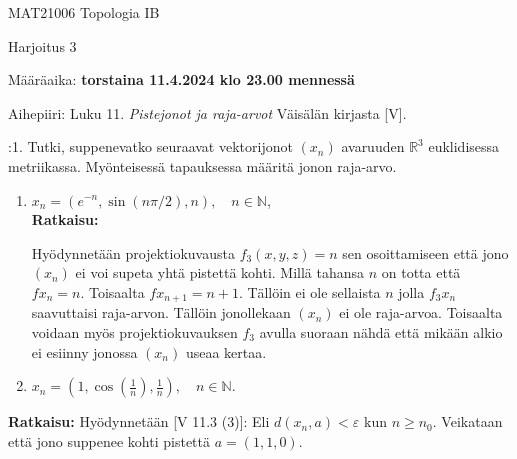 \documentclass[12pt,a4paper,leqno]{amsart}
\begin{document}
\noindent MAT21006 Topologia IB

\noindent Harjoitus 3 

\noindent  Määräaika:  \textbf{torstaina 11.4.2024 klo 23.00 mennessä} 

\bigskip
\begin{comment}

\noindent Ratkaisut palautetaan sähköisesti määräaikaan mennessä kurssin Moodle sivun viikottaiseen palautusalueeseen yhtenä (1) pdf-lähetyksenä. 

\smallskip

Viikolla 8.4-12.4.2024 on normaalit ohjausvuorot: tiistaina 9.4 klo 14.15-16  salissa  C322 ja  torstaina 11.4 klo 14-16 Ratkomossa  (kurssin Topologia IB ohjaaja).

\smallskip

Muina aikoina voi  kysyä  neuvoja tehtäviin Ratkomossa tai kurssin Moodle sivun Keskustelualueissa. Kurssin Topologia IA
Telegram-ryhmä jatkaa. 

\end{comment}
\medskip

Aihepiiri:  Luku 11. \textit{Pistejonot ja raja-arvot} Väisälän kirjasta [V]. 

\bigskip

:1.   Tutki, suppenevatko seuraavat vektorijonot $(x_n)$ avaruuden 
$\mathbb R^3$ euklidisessa metriikassa. Myönteisessä tapauksessa
määritä jonon raja-arvo.

\begin{enumerate}
\item  $x_n = (e^{-n},\sin(n\pi/2),n),  \quad n \in \mathbb N$,
\\
\textbf{Ratkaisu:}

Hyödynnetään projektiokuvausta $f_3(x, y, z) = n$ sen osoittamiseen että jono $(x_n)$ ei voi supeta yhtä pistettä kohti.  Millä tahansa $n$ on totta että $f x_n = n$. Toisaalta $fx_{n+1} = n+1$. Tällöin ei ole sellaista $n$ jolla $f_3 x_n$ saavuttaisi raja-arvon. Tällöin jonollekaan $(x_n)$ ei ole raja-arvoa. Toisaalta voidaan myös projektiokuvauksen $f_3$ avulla suoraan nähdä että mikään alkio ei esiinny jonossa $(x_n)$ useaa kertaa.


\smallskip

\item $x_n = (1, \cos(\frac{1}{n}),\frac{1}{n}),  \quad n \in \mathbb N$.
\end{enumerate}
\textbf{Ratkaisu:}
Hyödynnetään [V 11.3 (3)]:  Eli $d(x_n, a) < \varepsilon$ kun $n \geq n_0$. Veikataan että jono suppenee kohti pistettä $a = (1, 1, 0)$. 
\end{document}
